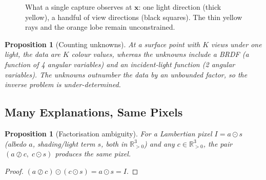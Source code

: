 \documentclass[11pt,a4paper]{article}
\newcommand{\R}{\mathbb{R}}
\newcommand{\x}{{\bm{x}}}
\theoremstyle{definition}
\theoremstyle{plain}
\newtheorem{proposition}[definition]{Proposition}
\theoremstyle{remark}
\begin{document}
\begin{figure}[!htbp]\centering
{}
\caption{What a single capture observes at $\x$: one light direction (thick yellow), a handful of view directions (black squares). The thin yellow rays and the orange lobe remain unconstrained.}
\end{figure}

\begin{proposition}[Counting unknowns]
At a surface point with $K$ views under one light, the data are $K$ colour values, whereas the unknowns include a BRDF (a function of 4 angular variables) and an incident-light function (2 angular variables). The unknowns outnumber the data by an unbounded factor, so the inverse problem is under-determined.
\end{proposition}

\subsection{Many Explanations, Same Pixels }

\begin{proposition}[Factorisation ambiguity]\label{prop:amb}
For a Lambertian pixel $I=a\odot s$ (albedo $a$, shading/light term $s$, both in $\R^3_{>0}$) and any $c\in\R^3_{>0}$, the pair $(a\oslash c,\;c\odot s)$ produces the same pixel.
\end{proposition}
\begin{proof}
$(a\oslash c)\odot(c\odot s)=a\odot s=I$.
\end{proof}
\end{document}
